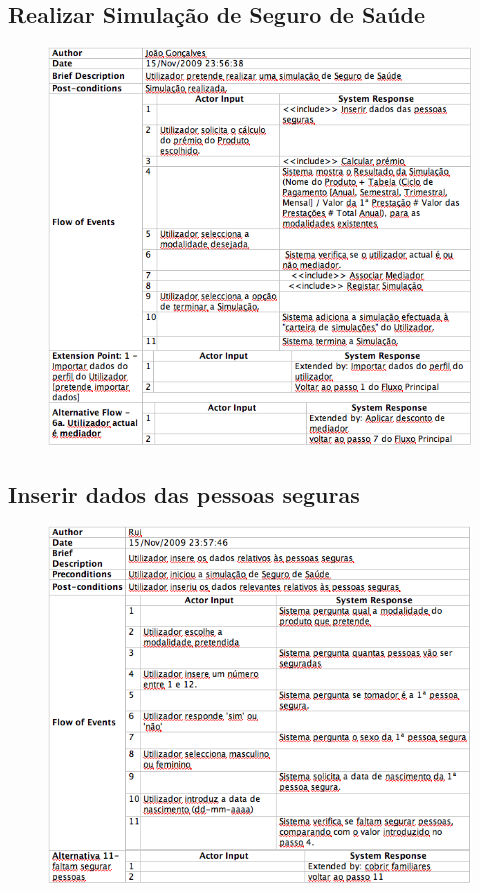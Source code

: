 \subsection{Realizar Simulação de Seguro de Saúde}
\begin{figure}[!htb]
	\centering
	\includegraphics[scale=0.6]{images/Prints/RealizacaoSeguroSaude/RealizarSimulacaoSaude.png}
\end{figure}

\pagebreak

\subsection{Inserir dados das pessoas seguras}
\begin{figure}[!htb]
	\centering
	\includegraphics[scale=0.7]{images/Prints/RealizacaoSeguroSaude/InserirDadosPessoasSeguras.png}
\end{figure}

